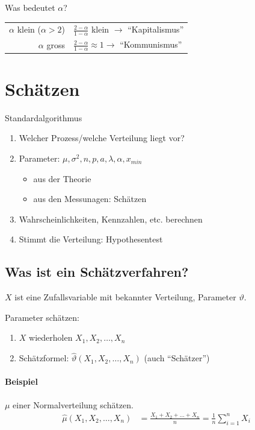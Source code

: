 \documentclass[10pt,a4paper]{scrartcl}
\begin{document}
Was bedeutet $\alpha$?
\begin{center}
\begin{tabular}{rl}
    $\alpha$ klein ($\alpha >2$) & $\frac{2-\alpha}{1-\alpha}$ klein $\rightarrow$ ``Kapitalismus'' \\
    $\alpha$ gross & $\frac{2-\alpha}{1-\alpha} \approx 1 \rightarrow$ ``Kommunismus''
\end{tabular}
\end{center}

\section{Schätzen}
Standardalgorithmus
\begin{enumerate}
\item Welcher Prozess/welche Verteilung liegt vor?
\item Parameter: $\mu, \sigma^2, n, p, a, \lambda, \alpha, x_{min}$
    \begin{itemize}
        \item aus der Theorie
        \item aus den Messunagen: Schätzen
    \end{itemize}
\item Wahrscheinlichkeiten, Kennzahlen, etc. berechnen
\item Stimmt die Verteilung: Hypothesentest
\end{enumerate}

\subsection{Was ist ein Schätzverfahren?}
$X$ ist eine Zufallsvariable mit bekannter Verteilung, Parameter $\vartheta$.

Parameter schätzen:
\begin{enumerate}
\item $X$ wiederholen $X_1, X_2, \dots, X_n$
\item Schätzformel: $\hat{\vartheta}(X_1, X_2, \dots, X_n)$ (auch ``Schätzer'')
\end{enumerate}

\paragraph{Beispiel} $\mu$ einer Normalverteilung schätzen.
\begin{align*}
    \hat{\mu}(X_1, X_2, \dots, X_n) &= \frac{X_1+ X_2+ \dots+ X_n}{n} = \frac{1}{n}\sum_{i=1}^n X_i 
\end{align*}
\end{document}

